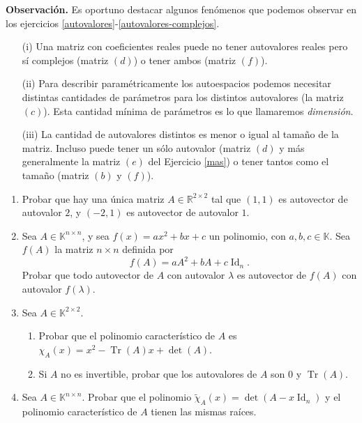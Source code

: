 \textbf{Observación.} Es oportuno destacar algunos fenómenos que podemos observar en los ejercicios \ref{autovalores}-\ref{autovalores-complejos}.
\begin{itemize}
 \item[(i)] Una matriz con coeficientes reales puede no tener autovalores reales pero sí complejos (matriz $(d)$) o tener ambos (matriz $(f)$).
 \item[(ii)] Para describir paramétricamente los autoespacios podemos necesitar distintas cantidades de parámetros para los distintos autovalores (la matriz $(c)$). Esta cantidad mínima de parámetros es lo que llamaremos {\it dimensión}.
 \item[(iii)] La cantidad de autovalores distintos es menor o igual al tama\~no de la matriz. Incluso puede tener un sólo autovalor (matriz $(d)$ y más generalmente la matriz $(e)$ del Ejercicio \ref{mas}) o tener tantos como el tama\~no (matriz $(b)$ y $(f)$).
\end{itemize}

\begin{enumerate}[resume,topsep=6pt,itemsep=.4cm]

\item Probar que hay una única matriz $A\in\mathbb{R}^{2\times 2}$ tal que $(1,1)$ es autovector de autovalor $2$, y $(-2,1)$ es autovector de autovalor $1$.
    

\item Sea $A\in\mathbb{K}^{n\times n}$, y sea $f(x) = ax^2+bx+c$ un polinomio, con $a,b,c\in\mathbb{K}$. Sea $f(A)$ la matriz $n \times n$ definida por
$$f(A) = a A^2+bA+c\operatorname{Id}_n.$$
Probar que todo autovector de $A$ con autovalor $\lambda$ es autovector de $f(A)$ con autovalor $f(\lambda)$.

    
\item Sea $A\in\mathbb{K}^{2\times 2}$.

    \begin{enumerate}     
        \item Probar que el polinomio característico de $A$ es \ $\chi_A(x) = x^2-\operatorname{Tr}(A)x+\det(A)$.
        \item Si $A$ no es invertible, probar que los autovalores de  $A$ son $0$ y $\operatorname{Tr}(A)$.
    \end{enumerate}

    \item Sea $A\in\mathbb{K}^{n\times n}$. Probar que el polinomio $\tilde\chi_A(x)=\det(A-x\operatorname{Id}_n)$ y el polinomio característico de $A$ tienen las mismas raíces.

\end{enumerate}


